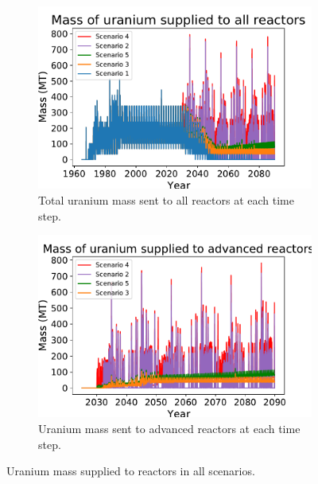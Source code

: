 \begin{figure}
    \centering
    \begin{subfigure}{0.45\textwidth}
        \centering
        \includegraphics[scale=0.4]{../figures/fuelsupply_scenarios_all.pdf}
        \caption{Total uranium mass sent to all reactors at each time step.}
        \label{fig:totalfuel_all}
    \end{subfigure}
    \hspace{0.8cm}
    \begin{subfigure}{0.45\textwidth}
        \centering
        \includegraphics[scale=0.4]{../figures/advancedRX_fuelsupply_scenarios_2-5.pdf}
        \caption{Uranium mass sent to advanced reactors at each time step.}
        \label{fig:haleufuel_all}
    \end{subfigure}
    \caption{Uranium mass supplied to reactors in all scenarios.}
    \label{fig:fuel_all}
\end{figure}

